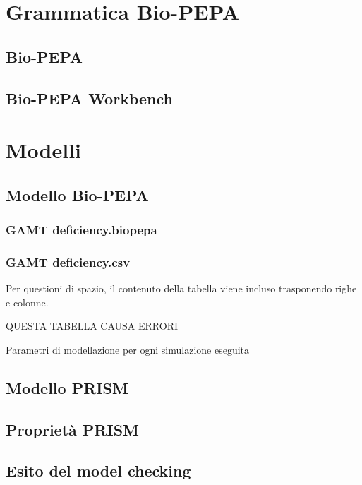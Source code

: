 \chapter{Grammatica Bio-PEPA}\label{cap:gramm}

	\section{Bio-PEPA}\label{sez:biopepagram}
	
	
	
	\section{Bio-PEPA Workbench}\label{sec:biopepawb}

\chapter{Modelli}\label{cap:gamtmodel}
	\section{Modello Bio-PEPA}
		\subsection{GAMT deficiency.biopepa}
			
		
		\subsection{GAMT deficiency.csv}
			Per questioni di spazio, il contenuto della tabella viene incluso trasponendo righe e colonne.
				\tabella
				\pgfplotstabletranspose*[input colnames to=Costanti]\trasposta\tabella
				\begin{table}[H]
					\begin{center}
QUESTA TABELLA CAUSA ERRORI%
					\end{center}
					\caption{Parametri di modellazione per ogni simulazione eseguita}
					\label{tab:csv}
				\end{table}
			
	\section{Modello PRISM}
	
	\section{Propriet\`a PRISM}
	
	\section{Esito del model checking}
